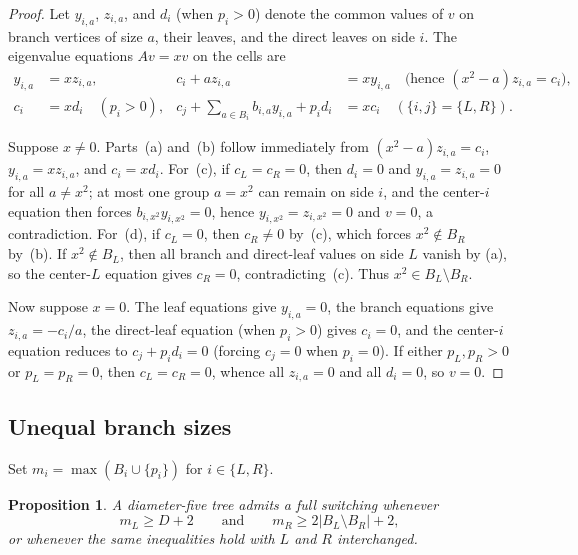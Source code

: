 \documentclass[11pt]{article}
\theoremstyle{plain}
\newtheorem{proposition}[theorem]{Proposition}
\theoremstyle{remark}
\begin{document}
\begin{proof}
Let $y_{i,a}$, $z_{i,a}$, and $d_i$ (when $p_i > 0$) denote the common values
of $v$ on branch vertices of size $a$, their leaves, and the direct leaves on
side $i$. The eigenvalue equations $Av = xv$ on the cells are
\begin{align*}
  y_{i,a} &= x z_{i,a}, &
  c_i + a z_{i,a} &= x y_{i,a} \quad\text{(hence }(x^2-a)z_{i,a} = c_i\text{)}, \\
  c_i &= x d_i \quad (p_i > 0), &
  c_j + \sum_{a \in B_i} b_{i,a} y_{i,a} + p_i d_i &= x c_i \quad (\{i,j\} = \{L,R\}).
\end{align*}

Suppose $x \neq 0$. Parts~(a) and~(b) follow immediately from
$(x^2-a)z_{i,a} = c_i$, $y_{i,a} = x z_{i,a}$, and $c_i = x d_i$. For~(c), if
$c_L = c_R = 0$, then $d_i = 0$ and $y_{i,a} = z_{i,a} = 0$ for all
$a \neq x^2$; at most one group $a = x^2$ can remain on side $i$, and the
center-$i$ equation then forces $b_{i,x^2} y_{i,x^2} = 0$, hence
$y_{i,x^2} = z_{i,x^2} = 0$ and $v = 0$, a contradiction. For~(d), if
$c_L = 0$, then $c_R \neq 0$ by~(c), which forces $x^2 \notin B_R$ by~(b). If
$x^2 \notin B_L$, then all branch and direct-leaf values on side $L$ vanish by
(a), so the center-$L$ equation gives $c_R = 0$, contradicting~(c). Thus
$x^2 \in B_L \setminus B_R$.

Now suppose $x = 0$. The leaf equations give $y_{i,a} = 0$, the branch
equations give $z_{i,a} = -c_i/a$, the direct-leaf equation (when $p_i > 0$)
gives $c_i = 0$, and the center-$i$ equation reduces to $c_j + p_i d_i = 0$
(forcing $c_j = 0$ when $p_i = 0$). If either $p_L, p_R > 0$ or
$p_L = p_R = 0$, then $c_L = c_R = 0$, whence all $z_{i,a} = 0$ and all
$d_i = 0$, so $v = 0$.
\end{proof}

\subsection{Unequal branch sizes}\label{sec:unequal}

Set $m_i = \max(B_i \cup \{p_i\})$ for $i \in \{L,R\}$.

\begin{proposition}\label{prop:heterogeneous}
A diameter-five tree admits a full switching whenever
\[
  m_L \geq D + 2 \qquad\text{and}\qquad m_R \geq 2|B_L \setminus B_R| + 2,
\]
or whenever the same inequalities hold with $L$ and $R$ interchanged.
\end{proposition}
\end{document}
